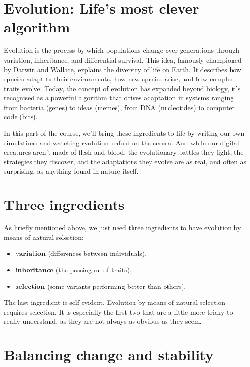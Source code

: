 \documentclass[
  letterpaper,
  DIV=11,
  numbers=noendperiod]{scrreprt}
\providecommand{\tightlist}{%
  \setlength{\itemsep}{0pt}\setlength{\parskip}{0pt}}\usepackage{longtable,booktabs,array}
\theoremstyle{definition}
\theoremstyle{remark}
\begin{document}
\section{Evolution: Life's most clever
algorithm}\label{evolution-lifes-most-clever-algorithm}

Evolution is the process by which populations change over generations
through variation, inheritance, and differential survival. This idea,
famously championed by Darwin and Wallace, explains the diversity of
life on Earth. It describes how species adapt to their environments, how
new species arise, and how complex traits evolve. Today, the concept of
evolution has expanded beyond biology, it's recognised as a powerful
algorithm that drives adaptation in systems ranging from bacteria
(genes) to ideas (memes), from DNA (nucleotides) to computer code
(bits).

In this part of the course, we'll bring these ingredients to life by
writing our own simulations and watching evolution unfold on the screen.
And while our digital creatures aren't made of flesh and blood, the
evolutionary battles they fight, the strategies they discover, and the
adaptations they evolve are as real, and often as surprising, as
anything found in nature itself.

\section{Three ingredients}\label{three-ingredients}

As briefly mentioned above, we just need three ingredients to have
evolution by means of natural selection:

\begin{itemize}
\tightlist
\item
  \textbf{variation} (differences between individuals),
\item
  \textbf{inheritance} (the passing on of traits),
\item
  \textbf{selection} (some variants performing better than others).
\end{itemize}

The last ingredient is self-evident. Evolution by means of natural
selection requires selection. It is especially the first two that are a
little more tricky to really understand, as they are not always as
obvious as they seem.

\section{Balancing change and
stability}\label{balancing-change-and-stability}
\end{document}
